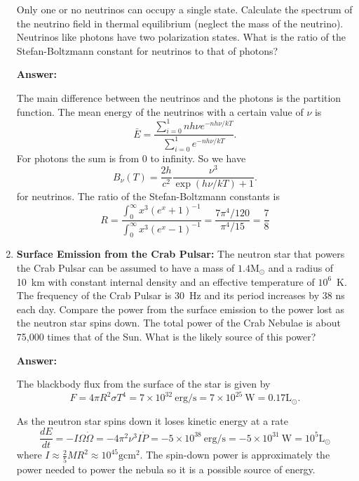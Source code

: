 \documentclass{article}
\begin{document}
\begin{enumerate}
Only one or no neutrinos can occupy a single state. Calculate the spectrum of the neutrino field in thermal equilibrium (neglect the mass of the neutrino). Neutrinos like photons have two polarization states. What is the ratio of the Stefan-Boltzmann constant for neutrinos to that of photons? 

{\bf Answer:}

The main difference between the neutrinos and the photons is the partition function.  The mean energy of the neutrinos with a certain value of $\nu$ is
\begin{equation}
{\bar E} = \frac{\sum_{i=0}^1 n h \nu e^{-n h\nu/kT}}{\sum_{i=0}^1 e^{-n h\nu/kT}}.
\end{equation}
For photons the sum is from 0 to infinity.  So we have
\begin{equation}
B_\nu (T) = \frac{2 h}{c^2} \frac{\nu^3}{\exp ( h \nu / k T) + 1}.
\end{equation}
for neutrinos.   The ratio of the Stefan-Boltzmann constants is
\begin{equation}
R = \frac{\int_0^\infty x^3 ( e^x + 1 )^{-1}}{\int_0^\infty x^3 (e^x - 1)^{-1}} = \frac{7 \pi^4/120}{\pi^4/15} = \frac{7}{8}
\end{equation}
\setcounter{enumi}{3}
\item {\bf Surface Emission from the Crab Pulsar:}  The neutron star
  that powers the Crab Pulsar can be assumed to have a mass of
  $1.4\mathrm{M}_\odot$ and a radius of 10~km with constant internal
  density and an effective temperature of $10^6$~K.  The frequency of
  the Crab Pulsar is 30~Hz and its period increases by 38 ns each
  day.  Compare the power from the surface emission to the power
  lost as the neutron star spins down.  The total power of the Crab
  Nebulae is about 75,000 times that of the Sun.  What is the likely
  source of this power?

{\bf Answer:}

The blackbody flux from the surface of the star is given by
\begin{equation}
F = 4 \pi R^2 \sigma T^4 = 7 \times 10^{32}~\mathrm{erg/s} = 7 \times 10^{25}~\mathrm{W} = 0.17 \mathrm{L}_\odot.
\end{equation}

As the neutron star spins down it loses kinetic energy at a rate
\begin{equation}
\frac{dE}{dt} = - I \Omega \dot \Omega = - 4\pi^2 \nu^3 I {\dot P} = 
-5 \times 10^{38}~\mathrm{erg/s} = -5 \times 10^{31}~\mathrm{W} = 10^{5}\mathrm{L}_\odot
\end{equation}
where $I \approx \frac{2}{5} M R^2 \approx 10^{45} \mathrm{g cm}^2$.
The spin-down power is approximately the power needed to power the
nebula so it is a possible source of energy.


\end{enumerate}
\end{document}

